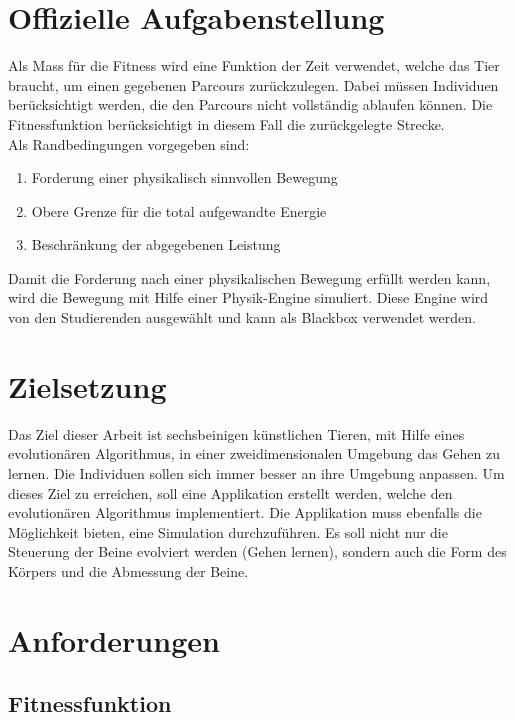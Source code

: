 
  \section{Offizielle Aufgabenstellung}
    Als Mass für die Fitness wird eine Funktion der Zeit verwendet, welche das Tier braucht,
    um einen gegebenen Parcours zurückzulegen.
    Dabei müssen Individuen berücksichtigt werden, die den Parcours nicht vollständig ablaufen können.
    Die Fitnessfunktion berücksichtigt in diesem Fall die zurückgelegte Strecke.
    \\
    Als Randbedingungen vorgegeben sind:
    \begin{enumerate}
      \item Forderung einer physikalisch sinnvollen Bewegung
      \item Obere Grenze für die total aufgewandte Energie
      \item Beschränkung der abgegebenen Leistung
    \end{enumerate}
    Damit die Forderung nach einer physikalischen Bewegung erfüllt werden kann,
    wird die Bewegung mit Hilfe einer Physik-Engine simuliert.
    Diese Engine wird von den Studierenden ausgewählt und kann als Blackbox verwendet werden.

  \section{Zielsetzung}

    Das Ziel dieser Arbeit ist sechsbeinigen künstlichen Tieren, mit Hilfe eines evolutionären Algorithmus, in einer zweidimensionalen Umgebung das Gehen zu lernen.
    Die Individuen sollen sich immer besser an ihre Umgebung anpassen.
    Um dieses Ziel zu erreichen, soll eine Applikation erstellt werden, welche den evolutionären Algorithmus implementiert.
    Die Applikation muss ebenfalls die Möglichkeit bieten, eine Simulation durchzuführen.
    Es soll nicht nur die Steuerung der Beine evolviert werden (Gehen lernen), sondern auch die Form des Körpers und die Abmessung der Beine.

  \section{Anforderungen}

    \subsection{Fitnessfunktion}

